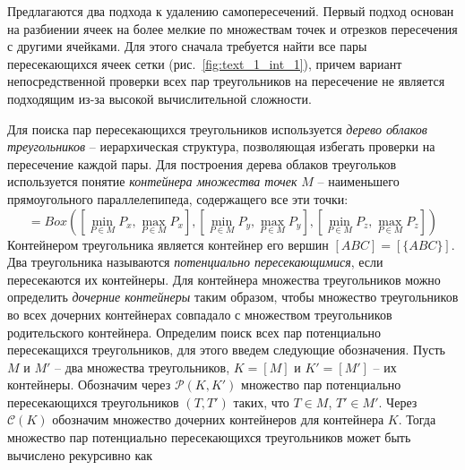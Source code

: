 \documentclass[a4paper,14pt]{extarticle}                     %
\theoremstyle{plain}                                         %
\begin{document}
Предлагаются два подхода к удалению самопересечений.
Первый подход основан на разбиении ячеек на более мелкие по множествам точек и отрезков пересечения с другими ячейками.
Для этого сначала требуется найти все пары пересекающихся ячеек сетки (рис.~\ref{fig:text_1_int_1}), причем вариант непосредственной проверки всех пар треугольников на пересечение не является подходящим из-за высокой вычислительной сложности.

Для поиска пар пересекающихся треугольников используется \textit{дерево облаков треугольников} -- иерархическая структура, позволяющая избегать проверки на пересечение каждой пары.
Для построения дерева облаков треугольков используется понятие \textit{контейнера множества точек} $M$ -- наименьшего прямоугольного параллелепипеда, содержащего все эти точки:
\begin{equation*}
[M] = Box \left( \left[\min_{P \in M}{P_x}, \max_{P \in M}{P_x}\right],
                 \left[\min_{P \in M}{P_y}, \max_{P \in M}{P_y}\right],
                 \left[\min_{P \in M}{P_z}, \max_{P \in M}{P_z}\right] \right)
\end{equation*}
Контейнером треугольника является контейнер его вершин $[ABC] = [\{ABC\}]$.
Два треугольника называются \textit{потенциально пересекающимися}, если пересекаются их контейнеры.
Для контейнера множества треугольников можно определить \textit{дочерние контейнеры} таким образом, чтобы множество треугольников во всех дочерних контейнерах совпадало с множеством треугольников родительского контейнера.
Определим поиск всех пар потенциально пересекащихся треугольников, для этого введем следующие обозначения.
Пусть $M$ и $M'$ -- два множества треугольников, $K = [M]$ и $K' = [M']$ -- их контейнеры.
Обозначим через $\mathscr{P}(K, K')$ множество пар потенциально пересекающихся треугольников $(T, T')$ таких, что $T \in M$, $T' \in M'$.
Через $\mathscr{C}(K)$ обозначим множество дочерних контейнеров для контейнера $K$.
Тогда множество пар потенциально пересекающихся треугольников может быть вычислено рекурсивно как
\end{document}
